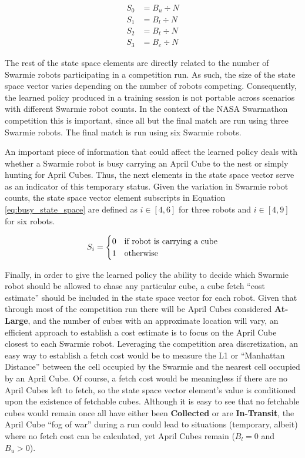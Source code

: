 \documentclass[sigconf,authordraft]{acmart}
\begin{document}
\begin{equation}\label{eq:state_space_0_3}
  \begin{aligned}
    S_0 &= B_u \div N \\
    S_1 &= B_l \div N \\
    S_2 &= B_t \div N \\
    S_3 &= B_c \div N
  \end{aligned}
\end{equation}

The rest of the state space elements are directly related to the number of Swarmie robots participating in a competition run. As such, the size of the state space vector varies depending on the number of robots competing. Consequently, the learned policy produced in a training session is not portable across scenarios with different Swarmie robot counts. In the context of the NASA Swarmathon competition this is important, since all but the final match are run using three Swarmie robots. The final match is run using six Swarmie robots.

An important piece of information that could affect the learned policy deals with whether a Swarmie robot is busy carrying an April Cube to the nest or simply hunting for April Cubes. Thus, the next elements in the state space vector serve as an indicator of this temporary status. Given the variation in Swarmie robot counts, the state space vector element subscripts in Equation \ref{eq:busy_state_space} are defined as $i \in [4,6]$ for three robots and $i \in [4,9]$ for six robots.

\begin{equation}\label{eq:busy_state_space}
  S_i =
    \begin{cases}
      0 & \textup{if robot is carrying a cube} \\
      1 & \textup{otherwise}
    \end{cases}
\end{equation}

Finally, in order to give the learned policy the ability to decide which Swarmie robot should be allowed to chase any particular cube, a cube fetch ``cost estimate'' should be included in the state space vector for each robot. Given that through most of the competition run there will be April Cubes considered \textbf{At-Large}, and the number of cubes with an approximate location will vary, an efficient approach to establish a cost estimate is to focus on the April Cube closest to each Swarmie robot. Leveraging the competition area discretization, an easy way to establish a fetch cost would be to measure the L1 or ``Manhattan Distance'' between the cell occupied by the Swarmie and the nearest cell occupied by an April Cube. Of course, a fetch cost would be meaningless if there are no April Cubes left to fetch, so the state space vector element's value is conditioned upon the existence of fetchable cubes. Although it is easy to see that no fetchable cubes would remain once all have either been \textbf{Collected} or are \textbf{In-Transit}, the April Cube ``fog of war'' during a run could lead to situations (temporary, albeit) where no fetch cost can be calculated, yet April Cubes remain ($B_l = 0$ and $B_u > 0$).
\end{document}
